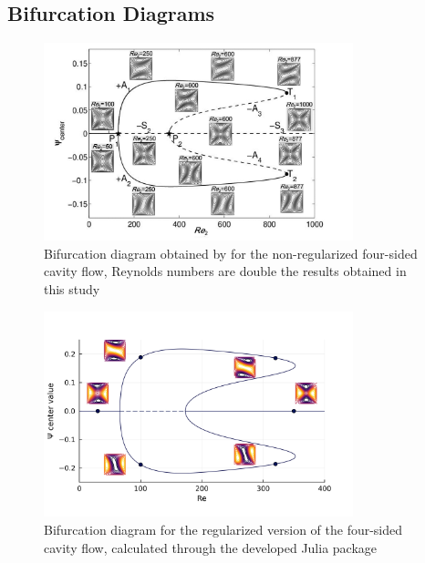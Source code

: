 \subsection{Bifurcation Diagrams}

\begin{figure}[h!]
  \begin{center}
  \includegraphics[width=0.8\textwidth]{figs/fig2_chen2013.png}
  \end{center}
  \label{fig:bif_diag_ref}
  \caption{Bifurcation diagram obtained by \cite{chen2013} for the
    non-regularized four-sided cavity flow, Reynolds numbers are 
    double the results obtained in this study} 
\end{figure}

\begin{figure}[h!]
  \begin{center}
  \includegraphics[width=0.8\textwidth]{figs/32x32_bif_diagram.png}
  \end{center}
  \label{fig:bif_diag}
  \caption{Bifurcation diagram for the regularized version of the four-sided
    cavity flow, calculated through the developed Julia package} 
\end{figure}
